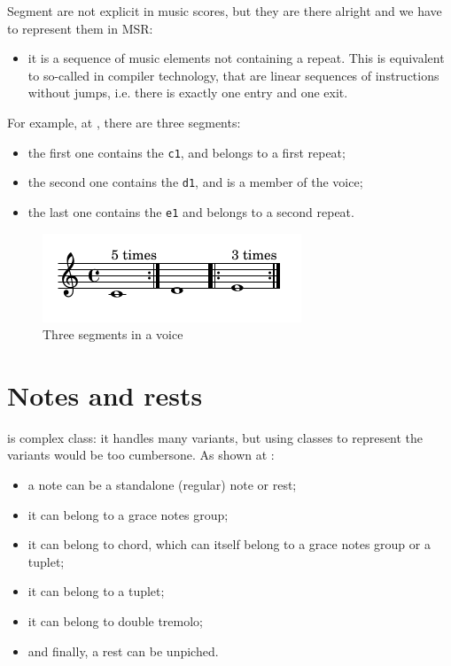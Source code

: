 Segment are not explicit in music scores, but they are there alright and we have to represent them in MSR:
\begin{itemize}
\item it is a sequence of music elements not containing a repeat. This is equivalent to so-called  in compiler technology, that are linear sequences of instructions without jumps, i.e. there is exactly one entry and one exit.%
\end{itemize}

For example, at , there are three segments:
\begin{itemize}
\item the first one contains the {\tt c1}, and belongs to a first repeat;
\item the second one contains the {\tt d1}, and is a member of the voice;
\item the last one contains the {\tt e1} and belongs to a second repeat.
\end{itemize}

\begin{figure}[htbp]
\begin{center}
\includegraphics{../graphics/RepeatFollowedByANoteAndARepeat.png}

\caption{Three segments in a voice}
\label{Three segments in a voice}
\end{center}
\end{figure}


\section{Notes and rests}\label{Notes and rests}

 is complex class: it handles many variants, but using classes to represent the variants would be too cumbersone. As shown at :
\begin{itemize}
\item a note can be a standalone (regular) note or rest;
\item it can belong to a grace notes group;
\item it can belong to chord, which can itself belong to a grace notes group or a tuplet;
\item it can belong to a tuplet;
\item it can belong to double tremolo;
\item and finally, a rest can be unpiched.
\end{itemize}

